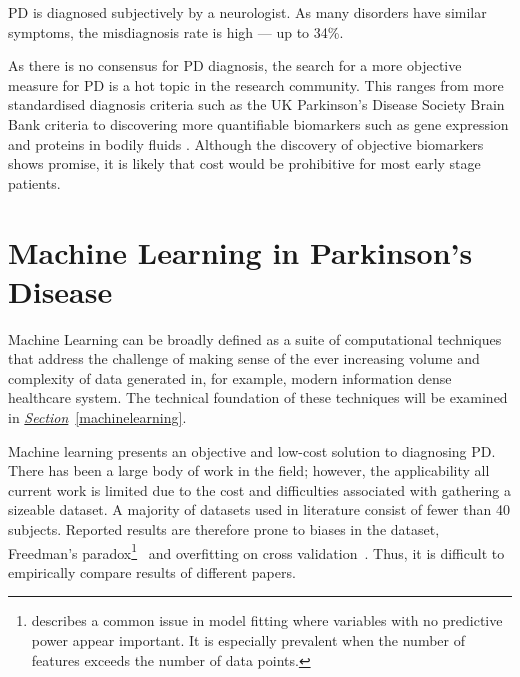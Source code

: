 \documentclass[12pt, twoside]{book}
\renewcommand\emph[1]{\textit{\color{USred}{#1}}}
\begin{document}
\begin{highlight}[Diagnosis]
PD is diagnosed subjectively by a neurologist. As many disorders have similar symptoms, the misdiagnosis rate is high --- up to 34\%.
\end{highlight}

As there is no consensus for PD diagnosis, the search for a more objective measure for PD is a hot topic in the research community. This ranges from more standardised diagnosis criteria such as the UK Parkinson's Disease Society Brain Bank criteria \cite{tolosadiagnosis26,brainbank,hughesdiagnosis100} to discovering more quantifiable biomarkers such as gene expression \cite{genemarkers, genome} and proteins in bodily fluids \cite{biomarkerfluid}. Although the discovery of objective biomarkers shows promise, it is likely that cost would be prohibitive for most early stage patients.

\section{Machine Learning in Parkinson's Disease}
\label{mlpd}
Machine Learning can be broadly defined as a suite of computational techniques that address the challenge of making sense of the ever increasing volume and complexity of data generated in, for example, modern information dense healthcare system. The technical foundation of these techniques will be examined in \textit{\hyperref[machinelearning]{Section}}~\ref{machinelearning}.

Machine learning presents an objective and low-cost solution to diagnosing PD. There has been a large body of work in the field; however, the applicability all current work is limited due to the cost and difficulties associated with gathering a sizeable dataset. A majority of datasets used in literature consist of fewer than 40 subjects. Reported results are therefore prone to biases in the dataset, Freedman's paradox\footnote{\emph{Freedman's paradox} describes a common issue in model fitting where variables with no predictive power appear important. It is especially prevalent when the number of features exceeds the number of data points.}~\cite{freedmanparadox} and overfitting on cross validation~\cite{overfittingcv}. Thus, it is difficult to empirically compare results of different papers.

\end{document}
